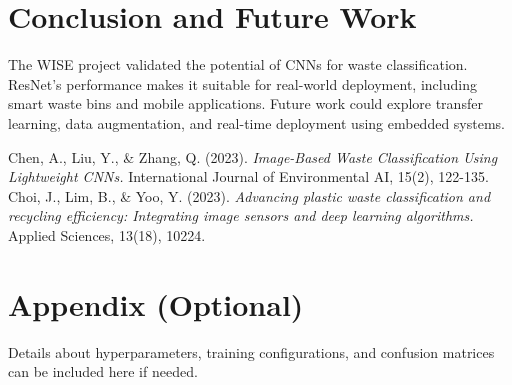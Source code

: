 \documentclass[11pt,twocolumn]{article}
\begin{document}
\section{Conclusion and Future Work}
\label{sec:conclusion}
The WISE project validated the potential of CNNs for waste classification. ResNet’s performance makes it suitable for real-world deployment, including smart waste bins and mobile applications. Future work could explore transfer learning, data augmentation, and real-time deployment using embedded systems.

%
\begin{thebibliography}{99}
Chen, A., Liu, Y., \& Zhang, Q. (2023).
\textit{Image-Based Waste Classification Using Lightweight CNNs.}
International Journal of Environmental AI, 15(2), 122-135.
Choi, J., Lim, B., \& Yoo, Y. (2023). 
\textit{Advancing plastic waste classification and recycling efficiency: Integrating image sensors and deep learning algorithms.}
Applied Sciences, 13(18), 10224.
\end{thebibliography}

\appendix
\section{Appendix (Optional)}
Details about hyperparameters, training configurations, and confusion matrices can be included here if needed.
\end{document}
